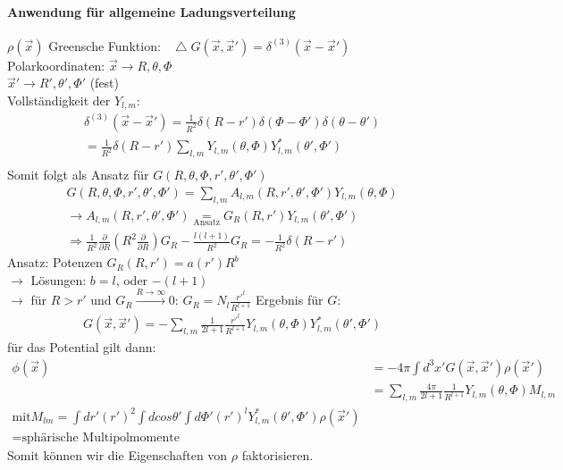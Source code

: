 \documentclass[a4paper]{article}
\newcommand*\laplace{\mathop{}\!\mathbin\bigtriangleup}
\begin{document}
\paragraph{Anwendung für allgemeine Ladungsverteilung} $\rho(\vec{x})$
Greensche Funktion: $\laplace
G(\vec{x},\vec{x}')=\delta^{(3)}(\vec{x}-\vec{x}')$\\
Polarkoordinaten: $\vec{x}\rightarrow R,\theta,\Phi$\\
$\vec{x}'\rightarrow R',\theta',\Phi'$ (fest)\\
Vollständigkeit der $Y_{l,m}$:
\begin{align}
\delta^{(3)}(\vec{x}-\vec{x}')=\frac{1}{R^2}
\delta(R-r')\delta(\Phi-\Phi')\delta(\theta-\theta')\\
=\frac{1}{R^2}\delta(R-r')\sum_{l,m}Y_{l,m}(\theta,\Phi)Y^*_{l,m}(\theta',\Phi')\\
\end{align}
Somit folgt als Ansatz für $G(R,\theta,\Phi,r',\theta',\Phi')$
\begin{align}
G(R,\theta,\Phi,r',\theta',\Phi')=
\sum_{l,m}A_{l,m}(R,r',\theta',\Phi')Y_{l,m}(\theta,\Phi)\\
\rightarrow
A_{l,m}(R,r',\theta',\Phi')\underset{\text{Ansatz}}{=}G_R(R,r')
Y_{l,m}(\theta',\Phi')\\
\Rightarrow \frac{1}{R^2}\frac{\partial}{\partial R}\left( R^2
\frac{\partial}{\partial R} \right)
G_R-\frac{l(l+1)}{R^2}G_R=-\frac{1}{R^2}\delta(R-r')
\end{align}
Ansatz: Potenzen $G_R(R,r')=a(r')R^b$\\
$\rightarrow$ Lösungen: $b=l$, oder $-(l+1)$\\
$\rightarrow$ für $R>r'$ und $G_R \overset{R\rightarrow\infty}{\rightarrow}0$:
$G_R=N_l\frac{r'^l}{R^{l+1}}$
Ergebnis für $G$:
\begin{align}
G(\vec{x},\vec{x}')=-\sum_{l,m}\frac{1}{2l+1}\frac{r'^l}{R^{l+1}}
Y_{l,m}(\theta,\Phi)Y^*_{l,m}(\theta',\Phi')
\end{align}
für das Potential gilt dann:
\begin{align}
\phi(\vec{x})&=-4\pi\int d^3x' G(\vec{x},\vec{x}')\rho(\vec{x}')\\
&=\sum_{l,m}\frac{4\pi}{2l+1}\frac{1}{R^{l+1}}Y_{l,m}(\theta,\Phi)M_{l,m}\\
\text{mit} M_{lm}=\int dr' (r')^2 \int dcos\theta'\int d\Phi' (r')^l
Y^*_{l,m}(\theta',\Phi') \rho(\vec{x}')\\=\text{sphärische Multipolmomente}
\end{align}
Somit können wir die Eigenschaften von $\rho$ faktorisieren.
\end{document}
